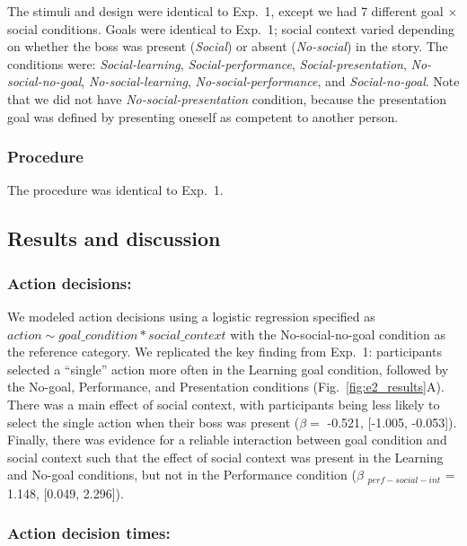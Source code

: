 \documentclass[10pt, letterpaper]{article}
\begin{document}
The stimuli and design were identical to Exp.~1, except we had 7
different goal \(\times\) social conditions. Goals were identical to
Exp.~1; social context varied depending on whether the boss was present
(\emph{Social}) or absent (\emph{No-social}) in the story. The
conditions were: \emph{Social-learning}, \emph{Social-performance},
\emph{Social-presentation}, \emph{No-social-no-goal},
\emph{No-social-learning}, \emph{No-social-performance}, and
\emph{Social-no-goal}. Note that we did not have
\emph{No-social-presentation} condition, because the presentation goal
was defined by presenting oneself as competent to another person.

\subsubsection{Procedure}\label{procedure-1}

The procedure was identical to Exp.~1.

\subsection{Results and discussion}\label{results-and-discussion-1}

\subsubsection{Action decisions:}\label{action-decisions-1}

We modeled action decisions using a logistic regression specified as
\texttt{$action \sim goal\_condition * social\_context$} with the
No-social-no-goal condition as the reference category. We replicated the
key finding from Exp.~1: participants selected a ``single'' action more
often in the Learning goal condition, followed by the No-goal,
Performance, and Presentation conditions (Fig.~\ref{fig:e2_results}A).
There was a main effect of social context, with participants being less
likely to select the single action when their boss was present
(\(\beta =\) -0.521, {[}-1.005, -0.053{]}). Finally, there was evidence
for a reliable interaction between goal condition and social context
such that the effect of social context was present in the Learning and
No-goal conditions, but not in the Performance condition (\(\beta\)
\(_{perf-social-int}\) = 1.148, {[}0.049, 2.296{]}).

\subsubsection{Action decision times:}\label{action-decision-times-1}
\end{document}
